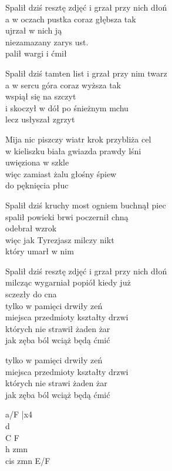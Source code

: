 \begin{text}
    Spalił dziś resztę zdjęć i grzał przy nich dłoń\\
    a w oczach pustka coraz głębsza tak\\
    ujrzał w nich ją\\
    niezamazany zarys ust.\\
    palił wargi i ćmił

    Spalił dziś tamten list i grzał przy nim twarz\\
    a w sercu góra coraz wyższa tak\\
    wspiął się na szczyt\\
    i skoczył w dół po śnieżnym mchu\\
    lecz usłyszał zgrzyt

    Mija nic piszczy wiatr krok przybliża cel\\
    w kieliszku biała gwiazda prawdy lśni\\
    uwięziona w szkle\\
    więc zamiast żalu głośny śpiew\\
    do pęknięcia płuc

    Spalił dziś kruchy most ogniem buchnął piec\\
    spalił powieki brwi poczernił chną\\
    odebrał wzrok\\
    więc jak Tyrezjasz milczy nikt\\
    który umarł w nim

    Spalił dziś resztę zdjęć i grzał przy nich dłoń\\
    milcząc wygarniał popiół kiedy już\\
    sczezły do cna\\
    tylko w pamięci drwiły zeń\\
    miejsca przedmioty kształty drzwi\\
    których nie strawił żaden żar\\
    jak zęba ból wciąż będą ćmić

    tylko w pamięci drwiły zeń\\
    miejsca przedmioty kształty drzwi\\
    których nie strawi żaden żar\\
    jak zęba ból wciąż będą ćmić
\end{text}
\begin{chord}
    a/F |x4\\
    d\\
    C F\\
    h zmn\\
    cis zmn E/F
\end{chord}